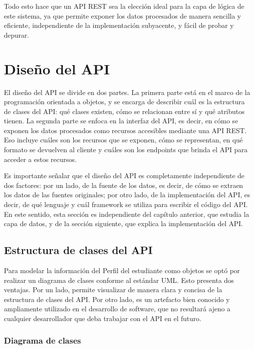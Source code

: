 Todo esto hace que un \gls{API REST} sea la elección ideal para la capa de lógica de este sistema, ya que permite exponer los datos procesados de manera sencilla y eficiente, independiente de la implementación subyacente, y fácil de probar y depurar.

\section{Diseño del API}

El diseño del \gls{API} se divide en dos partes. La primera parte está en el marco de la programación orientada a objetos, y se encarga de describir cuál es la estructura de clases del \gls{API}: qué clases existen, cómo se relacionan entre sí y qué atributos tienen. La segunda parte se enfoca en la interfaz del \gls{API}, es decir, en cómo se exponen los datos procesados como recursos accesibles mediante una \gls{API REST}. Eso incluye cuáles son los recursos que se exponen, cómo se representan, en qué formato se devuelven al cliente y cuáles son los endpoints que brinda el \gls{API} para acceder a estos recursos.

Es importante señalar que el diseño del \gls{API} es completamente independiente de dos factores: por un lado, de la fuente de los datos, es decir, de cómo se extraen los datos de las fuentes originales; por otro lado, de la implementación del \gls{API}, es decir, de qué lenguaje y cuál framework se utiliza para escribir el código del \gls{API}. En este sentido, esta sección es independiente del capítulo anterior, que estudia la capa de datos, y de la sección siguiente, que explica la implementación del \gls{API}.

\subsection{Estructura de clases del API}

Para modelar la información del Perfil del estudiante como objetos se optó por realizar un diagrama de clases conforme al estándar \gls{UML}. Esto presenta dos ventajas. Por un lado, permite visualizar de manera clara y concisa de la estructura de clases del \gls{API}. Por otro lado, es un artefacto bien conocido y ampliamente utilizado en el desarrollo de software, que no resultará ajeno a cualquier desarrollador que deba trabajar con el \gls{API} en el futuro.

\subsubsection{Diagrama de clases}

